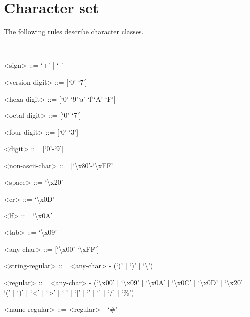\section{Character set}
\label{gram:chars}

The following rules describe character classes.

~

\begin{grammar}
<sign> ::= `+' | `-'

<version-digit> ::= [`0'-`7']

<hexa-digit> ::= [`0'-`9'`a'-`f'`A'-`F']

<octal-digit> ::= [`0'-`7']

<four-digit> ::= [`0'-`3']

<digit> ::= [`0'-`9']

<non-ascii-char> ::= [`\textbackslash x80'-`\textbackslash xFF']

<space> ::= `\textbackslash x20'

<cr> ::= `\textbackslash x0D'

<lf> ::= `\textbackslash x0A'

<tab> ::= `\textbackslash x09'

<any-char> ::= [`\textbackslash x00'-`\textbackslash xFF']

<string-regular> ::= <any-char> - (`(' | `)' | `\textbackslash')

<regular> ::= <any-char> - (`\textbackslash x00' | `\textbackslash x09' | `\textbackslash x0A' | `\textbackslash x0C' | `\textbackslash x0D' | `\textbackslash x20' | `(' | `)' | `<' | `>' | `[' | `]' | `{' | `}' | `/' | `\%')

<name-regular> ::= <regular> - `\#'
\end{grammar}

